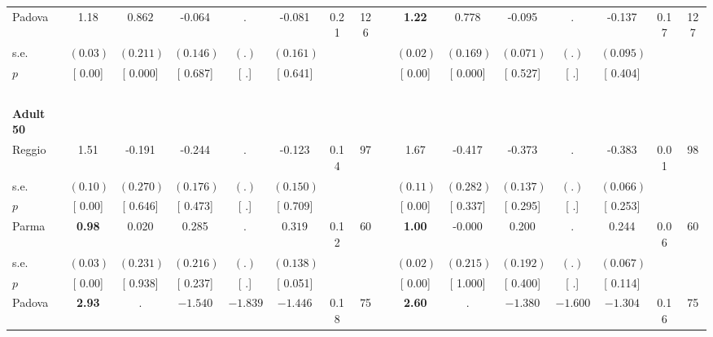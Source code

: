 \begin{longtable}{L{8em} c c c c c c c p{1em} c c c c c c c}
\quad \quad \quad Padova& 1.18 & $ \mathbf{    0.862}$ &    -0.064 &         . &    -0.081 &      0.21 &       126 & & \textbf{     1.22} & $ \mathbf{    0.778}$ &    -0.095 &         . &    -0.137 &      0.17 &       127  \\*
\quad \quad \quad \quad s.e.& $ (     0.03)$ & $ (    0.211)$ & $ (    0.146)$ & $ (        .)$ & $ (    0.161)$ & & & & $ (     0.02)$ & $ (    0.169)$ & $ (    0.071)$ & $ (        .)$ & $ (    0.095)$ & &  \\*
\quad \quad \quad \quad $ p$ & [     0.00] & [    0.000] & [    0.687] & [        .] & [    0.641] & & & & [     0.00] & [    0.000] & [    0.527] & [        .] & [    0.404] & &  \\[1em]
~\\[1em]
\quad \quad \textbf{Adult 50} & & & & & & & & & & & & & & & \\* 
\quad \quad \quad Reggio& 1.51 &    -0.191 &    -0.244 &         . &    -0.123 &      0.14 &        97 & & 1.67 &    -0.417 &    -0.373 &         . &    -0.383 &      0.01 &        98  \\*
\quad \quad \quad \quad s.e.& $ (     0.10)$ & $ (    0.270)$ & $ (    0.176)$ & $ (        .)$ & $ (    0.150)$ & & & & $ (     0.11)$ & $ (    0.282)$ & $ (    0.137)$ & $ (        .)$ & $ (    0.066)$ & &  \\*
\quad \quad \quad \quad $ p$ & [     0.00] & [    0.646] & [    0.473] & [        .] & [    0.709] & & & & [     0.00] & [    0.337] & [    0.295] & [        .] & [    0.253] & &  \\[1em]
\quad \quad \quad Parma& \textbf{     0.98} &     0.020 &     0.285 &         . & $ \mathbf{    0.319}$ &      0.12 &        60 & & \textbf{     1.00} &    -0.000 &     0.200 &         . &     0.244 &      0.06 &        60  \\*
\quad \quad \quad \quad s.e.& $ (     0.03)$ & $ (    0.231)$ & $ (    0.216)$ & $ (        .)$ & $ (    0.138)$ & & & & $ (     0.02)$ & $ (    0.215)$ & $ (    0.192)$ & $ (        .)$ & $ (    0.067)$ & &  \\*
\quad \quad \quad \quad $ p$ & [     0.00] & [    0.938] & [    0.237] & [        .] & [    0.051] & & & & [     0.00] & [    1.000] & [    0.400] & [        .] & [    0.114] & &  \\[1em]
\quad \quad \quad Padova& \textbf{     2.93} &         . & $ \mathbf{   -1.540}$ & $ \mathbf{   -1.839}$ & $ \mathbf{   -1.446}$ &      0.18 &        75 & & \textbf{     2.60} &         . & $ \mathbf{   -1.380}$ & $ \mathbf{   -1.600}$ & $ \mathbf{   -1.304}$ &      0.16 &        75  \\*

\end{longtable}
